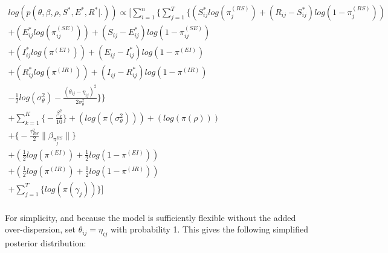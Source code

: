 \documentclass[12pt]{article}
\begin{document}
\begin{center}
\begin{multline}
\displaystyle
log(p(\theta,\beta,\rho,S^*,E^*,R^*|.)) \propto \Bigg[ 
    \sum_{i=1}^n \bigg\{ \sum_{j=1}^T
        \Big\{
            (S^*_{ij}log(\pi_j^{(RS)}) + (R_{ij} - S^*_{ij})log(1-\pi_j^{(RS)})) \\
            + (E^*_{ij}log(\pi_{ij}^{(SE)})) + (S_{ij} - E^*_{ij})log(1-\pi_{ij}^{(SE)}) \\
            + (I^*_{ij}log(\pi^{(EI)})) + (E_{ij} - I^*_{ij})log(1-\pi^{(EI)}) \\
            + (R^*_{ij}log(\pi^{(IR)})) + (I_{ij} - R^*_{ij})log(1-\pi^{(IR)}) \\
    - \frac{1}{2}log(\sigma^2_{\theta}) - \frac{(\theta_{ij}-\eta_{ij})^2}{2\sigma^2_{\theta}}\Big\}\bigg\} \\
    + \sum_{k = 1}^K\bigg\{-\frac{\beta^2_k}{10}\bigg\}
            + (log(\pi(\sigma^2_{\theta})))
            + (log(\pi(\rho)))\\
            + \bigg\{ -\frac{\tau^2_{RS}}{2}\|\beta_{\pi_j^{RS}}\|  \bigg\} \\ 
            + (\frac{1}{2}log(\pi^{(EI)}) + \frac{1}{2}log(1-\pi^{(EI)})) \\
            + (\frac{1}{2}log(\pi^{(IR)}) + \frac{1}{2}log(1-\pi^{(IR)}))    \\
            + \sum_{j=1}^{T} \bigg\{ log(\pi(\gamma_j)) \bigg\} \Bigg]\\
\end{multline}
\end{center}

For simplicity, and because the model is sufficiently flexible without the added over-dispersion, set $\theta_{ij} = \eta_{ij}$ with probability 1. This 
gives the following simplified posterior distribution:
\end{document}
